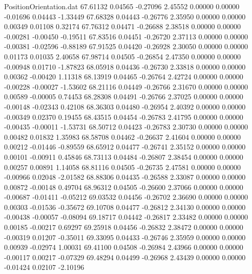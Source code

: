 \begin{filecontents}{PositionOrientation.dat}
  67.61132    0.04565   -0.27096     2.45552    0.00000    0.00000   -0.01696    0.04443   -1.33449
  67.68328    0.04443   -0.26776     2.35950    0.00000    0.00000    0.00349    0.01108    0.32174
  67.76312    0.04471   -0.26688     2.38518    0.00000    0.00000   -0.00281   -0.00450   -0.19511
  67.83516    0.04451   -0.26720     2.37113    0.00000    0.00000   -0.00381   -0.02596   -0.88189
  67.91525    0.04420   -0.26928     2.30050    0.00000    0.00000    0.01173    0.01035    2.40658
  67.98714    0.04505   -0.26854     2.47350    0.00000    0.00000   -0.00948    0.01710   -1.87823
  68.05918    0.04436   -0.26730     2.33818    0.00000    0.00000    0.00362   -0.00420    1.11318
  68.13919    0.04465   -0.26764     2.42724    0.00000    0.00000   -0.00228   -0.00027   -1.53602
  68.21116    0.04449   -0.26766     2.31670    0.00000    0.00000    0.00589   -0.00005    0.74453
  68.28308    0.04491   -0.26766     2.37025    0.00000    0.00000   -0.00148   -0.02343    0.42108
  68.36303    0.04480   -0.26954     2.40392    0.00000    0.00000   -0.00349    0.02370    0.19455
  68.43515    0.04454   -0.26783     2.41795    0.00000    0.00000   -0.00435   -0.00011   -1.53731
  68.50712    0.04423   -0.26783     2.30730    0.00000    0.00000    0.00482    0.01832    1.35983
  68.58708    0.04462   -0.26637     2.41604    0.00000    0.00000    0.00212   -0.01446   -0.89559
  68.65912    0.04477   -0.26741     2.35152    0.00000    0.00000    0.00101   -0.00911    0.45846
  68.73113    0.04484   -0.26807     2.38454    0.00000    0.00000    0.00257    0.00891    1.14058
  68.81116    0.04505   -0.26735     2.47581    0.00000    0.00000   -0.00966    0.02048   -2.01582
  68.88306    0.04435   -0.26588     2.33087    0.00000    0.00000    0.00872   -0.00148    0.49704
  68.96312    0.04505   -0.26600     2.37066    0.00000    0.00000   -0.00687   -0.01411   -0.05212
  69.03532    0.04456   -0.26702     2.36690    0.00000    0.00000    0.00303   -0.01536   -0.35672
  69.10708    0.04477   -0.26812     2.34130    0.00000    0.00000   -0.00438   -0.00057   -0.08094
  69.18717    0.04442   -0.26817     2.33482    0.00000    0.00000    0.00185   -0.00217    0.69297
  69.25918    0.04456   -0.26832     2.38472    0.00000    0.00000   -0.00319    0.01207   -0.35011
  69.33095    0.04433   -0.26746     2.35959    0.00000    0.00000    0.00939   -0.02974    1.00031
  69.41100    0.04508   -0.26984     2.43966    0.00000    0.00000   -0.00117    0.00217   -0.07329
  69.48294    0.04499   -0.26968     2.43439    0.00000    0.00000   -0.01424    0.02107   -2.10196

\end{filecontents}
